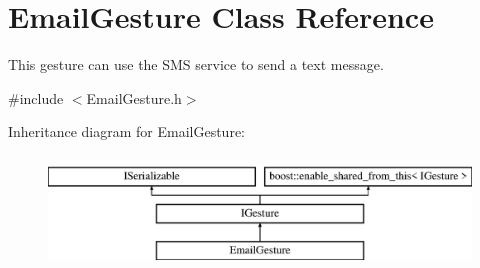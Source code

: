 \hypertarget{class_email_gesture}{}\section{Email\+Gesture Class Reference}
\label{class_email_gesture}


This gesture can use the S\+MS service to send a text message.  




{\ttfamily \#include $<$Email\+Gesture.\+h$>$}

Inheritance diagram for Email\+Gesture\+:\begin{figure}[H]
\begin{center}
\leavevmode
\includegraphics[height=3.000000cm]{class_email_gesture}
\end{center}
\end{figure}
